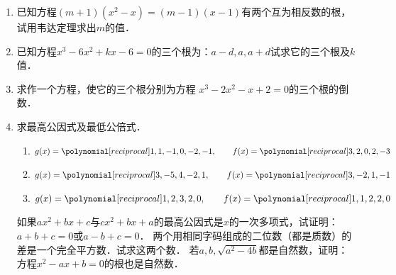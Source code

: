 \begin{enumerate}
\staritem 证明以下各题：
\begin{enumerate}
    \item 若$n$为偶数，$n^3-n$可被6整除；若$n$为奇数，$n^3-n$可被24整除；
    \item $53^{53}-33^{33}$可被10整除；
    \item 四个连续自然数的乘积加1，必是一个完全平方数；
    \item 若一数除以5余1，另一数除以5余2，则这两个数的平方和能被5整除．
\end{enumerate}

\item 已知方程$(m+1)(x^2-x)=(m-1)(x-1)$有两个互为相反数的根，试用韦达定理求出$m$的值．
\item 已知方程$x^3-6x^2+kx-6=0$的三个根为：$a-d,a,a+d$试求它的三个根及$k$值．
\item 求作一个方程，使它的三个根分别为方程 $x^3-2x^2-x+2=0$的三个根的倒数．

\item 求最高公因式及最低公倍式．
\begin{enumerate}
    \item $g(x)=\poly{1,1,-1,0,-2,-1},\qquad f(x)=\poly{3,2,0,2,-3}$
    \item $g(x)=\poly{3,-5,4,-2,1},\qquad f(x)=\poly{3,-2,1,-1}$
    \item $g(x)=\poly{1,2,3,2,0},\qquad f(x)=\poly{1,1,2,2,0}$
\end{enumerate}


\staritem 如果$ax^2+bx+c$与$cx^2+bx+a$的最高公因式是$x$的一次多项式，试证明：
$a+b+c=0$或$a-b+c=0$．
\staritem 两个用相同字码组成的二位数（都是质数）的差是一个完全平方数．试求这两个数．
\staritem 若$a,b,\sqrt{a^2-4b}$都是自然数，证明：方程$x^2-ax+b=0$的根也是自然数．

\end{enumerate}

